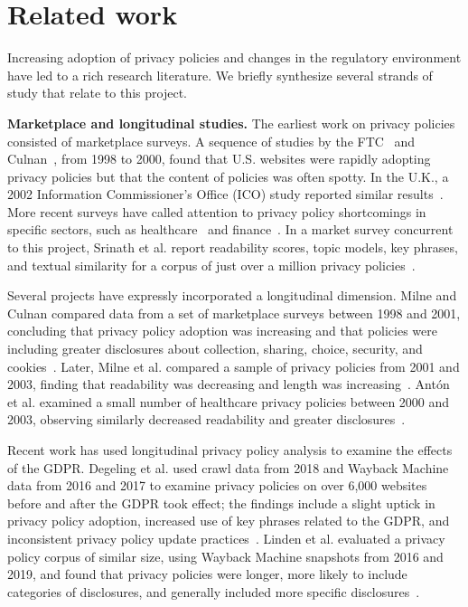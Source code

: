\section{Related work}
\label{sec:related}

Increasing adoption of privacy policies and changes in the regulatory environment have led to a rich research literature. We briefly synthesize several strands of study that relate to this project.

\textbf{Marketplace and longitudinal studies.}
The earliest work on privacy policies consisted of marketplace surveys. A sequence of studies by the FTC~\cite{ftc-privacy-survey1998, ftc-privacy-survey2000} and Culnan~\cite{culnan2000protecting}, from 1998 to 2000, found that U.S. websites were rapidly adopting privacy policies but that the content of policies was often spotty. In the U.K., a 2002 Information Commissioner's Office (ICO) study reported similar results~\cite{ico-survey2002}. More recent surveys have called attention to privacy policy shortcomings in specific sectors, such as healthcare~\cite{sunyaev15} and finance~\cite{bowers2017}. In a market survey concurrent to this project, Srinath et al. report readability scores, topic models, key phrases, and textual similarity for a corpus of just over a million privacy policies~\cite{srinath2020}.

Several projects have expressly incorporated a longitudinal dimension. Milne and Culnan compared data from a set of marketplace surveys between 1998 and 2001, concluding that privacy policy adoption was increasing and that policies were including greater disclosures about collection, sharing, choice, security, and cookies~\cite{milne2002}. Later, Milne et al. compared a sample of privacy policies from 2001 and 2003, finding that readability was decreasing and length was increasing~\cite{milne2006longitudinal}. Antón et al. examined a small number of healthcare privacy policies between 2000 and 2003, observing similarly decreased readability and greater disclosures~\cite{anton2007hipaa}.

Recent work has used longitudinal privacy policy analysis to examine the effects of the GDPR. Degeling et al. used crawl data from 2018 and Wayback Machine data from 2016 and 2017 to examine privacy policies on over 6,000 websites before and after the GDPR took effect; the findings include a slight uptick in privacy policy adoption, increased use of key phrases related to the GDPR, and inconsistent privacy policy update practices~\cite{degeling2018we}. Linden et al. evaluated a privacy policy corpus of similar size, using Wayback Machine snapshots from 2016 and 2019, and found that privacy policies were longer, more likely to include categories of disclosures, and generally included more specific disclosures~\cite{linden2020privacy}.

